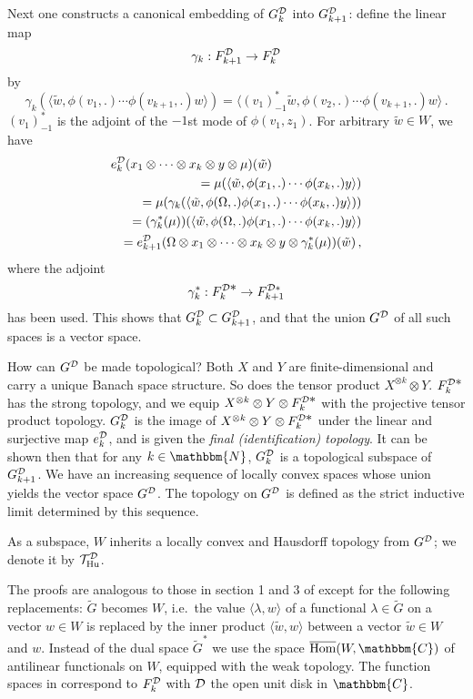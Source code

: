 \documentclass[a4paper,12pt,twoside]{article}
\renewcommand{\b}{\langle}
\renewcommand{\k}{\rangle}
\renewcommand{\c}[1]{{\cal #1}}
\newcommand{\bN}{\mathbbm{N}}
\newcommand{\bC}{\mathbbm{C}}
\newcommand{\tG}{\tilde{G}}
\newcommand{\cT}{{\cal T}}
\newcommand{\D}{\c{D}}
\newcommand{\Hu}{{\rm Hu}}
\newcommand{\THud}{\cT_{\Hu}^{\D}}
\newcommand{\Fd}{F^{\D}_k}
\newcommand{\gak}{\gamma_k}
\newcommand{\Fdd}{F^{\D{\textstyle *}}_k}
\newcommand{\ed}{e_k^{\D}}
\newcommand{\Gdk}{G^{\D}_k}
\newcommand{\Gd}{G^{\D}}
\newcommand{\wt}{\tilde{w}}
\begin{document}
Next one constructs a canonical embedding of
$\Gdk$ into $G^{\D}_{k+1}$: define the linear map
$$\gak: F^{\D}_{k+1}\to\Fd$$
by
$$\gak(\b\wt,\phi(v_1,.)\cdots\phi(v_{k+1},.)w\k)
= \b (v_1)_{-1}^* \wt,\phi(v_2,.)\cdots\phi(v_{k+1},.)w\k\,.$$
$(v_1)_{-1}^*$ is the adjoint of the $-1$st mode of $\phi(v_1,z_1)$.
For arbitrary $\wt\in W$, we have
\begin{eqnarray*}
\lefteqn{
\ed(x_1\otimes\cdots\otimes x_k\otimes y\otimes\mu)(\wt)} \\
&&= \mu(\b \wt, \phi(x_1,.)\cdots \phi(x_k,.)y\k) \\
&&= \mu(\gak(\b \wt,\phi(\Omega,.)\phi(x_1,.)\cdots \phi(x_k,.)y\k)) \\
&&= (\gak^*(\mu))(\b \wt,\phi(\Omega,.)\phi(x_1,.)\cdots \phi(x_k,.)y\k) \\
&&= e_{k+1}^{\D}(\Omega\otimes x_1\otimes\cdots\otimes x_k\otimes
y\otimes\gak^*(\mu))(\wt)\,,
\end{eqnarray*}
where the adjoint
$$\gak^*:\Fdd\to F^{\D*}_{k+1}$$
has been used. This shows that $\Gdk\subset G^{\D}_{k+1}$,
and that the union $\Gd$ of all
such spaces is a  vector space.

How can $\Gd$ be made topological?
Both $X$ and $Y$ are finite-dimensional and carry a unique Banach space structure.
So does the tensor product $X^{\otimes k}\otimes Y$. $\Fdd$ has the strong topology, and
we equip $X^{\otimes k}\otimes Y\otimes\Fdd$ with the projective tensor product
topology. $\Gdk$ is the image of $X^{\otimes k}\otimes Y\otimes\Fdd$ under the
linear and surjective map $\ed$, and is given the {\it final
(identification) topology}. It can
be shown then that for any $k\in\bN$, $\Gdk$
is a topological subspace of $\Gd_{k+1}$. We have an increasing sequence of
locally convex spaces whose union yields the vector space $\Gd$.
The topology on $\Gd$ is defined as the strict inductive limit
determined by this sequence.

As a subspace, $W$ inherits a locally convex and Hausdorff topology from $\Gd$;
we denote it by $\THud$.

The proofs are analogous to those in
section 1 and 3 of \cite{Huang} except for the following
replacements:
$\tG$ becomes $W$, i.e.\ the value
$\b\lambda,w\k$ of a functional $\lambda\in\tG$ on a vector
$w\in W$ is replaced by the inner product $\b\wt,w\k$
between a vector $\wt\in W$ and $w$. Instead of the dual space $\tG^*$
we use the space $\overline{\rm Hom}(W,\bC)$ of antilinear
functionals on $W$, equipped with the weak topology.
The function spaces in \cite{Huang} correspond to $\Fd$ with $\D$ the open unit
disk in $\bC$.
\end{document}

